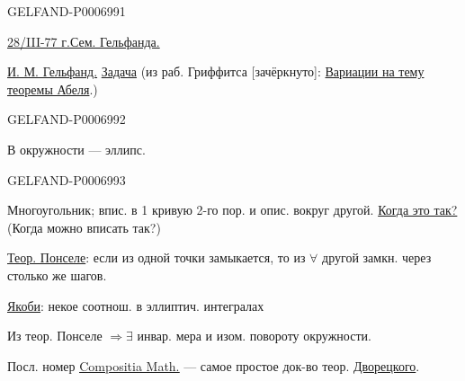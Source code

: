 \begin{GelfandAdjacentEvidence}{GELFAND-P000699}{1}

\underline{28/III-77 г.}\qquad\underline{Сем. Гельфанда.}

\underline{И. М. Гельфанд.}\qquad
\underline{Задача} (из раб. Гриффитса [зачёркнуто]:
\href{https://publications.ias.edu/pg/paper/214}{Вариации на тему теоремы Абеля}.)
\end{GelfandAdjacentEvidence}
\begin{GelfandAdjacentEvidence}{GELFAND-P000699}{2}


В окружности --- эллипс.

\end{GelfandAdjacentEvidence}
\begin{GelfandAdjacentEvidence}{GELFAND-P000699}{3}


Многоугольник; впис. в 1 кривую 2-го пор. и опис. вокруг другой.
\underline{Когда это так?} (Когда можно вписать так?)

\underline{Теор. Понселе}: если из одной точки замыкается, то из \(\forall\) другой замкн. через столько же шагов.

\underline{Якоби}: некое соотнош. в эллиптич. интегралах

Из теор. Понселе \(\Rightarrow\exists\) инвар. мера и изом. повороту окружности.

Посл. номер \href{https://www.numdam.org/item/CM_1976__33_3_297_0/}{\underline{Compositia Math.}}
--- самое простое док-во теор. \underline{Дворецкого}.
\end{GelfandAdjacentEvidence}
